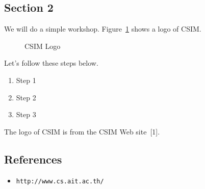 \documentclass{article}
\begin{document}
\FloatBarrier

\subsection*{Section 2}

\noindent We will do a simple workshop. Figure~\ref{fig:csim-logo} shows
a logo of CSIM. \\

\begin{figure}[t]
    \centering
    \caption{CSIM Logo}
    \label{fig:csim-logo}
\end{figure}

\noindent Let's follow these steps below.

\begin{enumerate}
    \item Step 1
    \item Step 2
    \item Step 3
\end{enumerate}

\noindent The logo of CSIM is from the CSIM Web site~[1]. \\

\subsection*{References}

\begin{itemize}
    \item[1] \tt{http://www.cs.ait.ac.th/}
\end{itemize}
\end{document}
